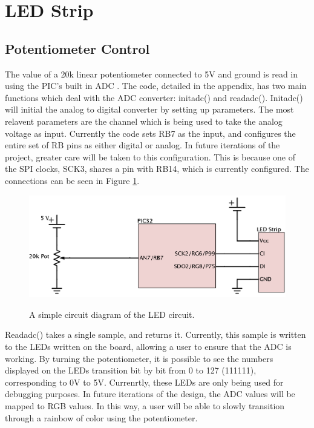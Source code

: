 \documentclass[11pt]{article}
\begin{document}
 
 

\section{LED Strip}

\subsection{Potentiometer Control}
The value of a 20k linear potentiometer connected to 5V and ground is read in using the PIC's built in ADC \cite{Section17ADC}. The code, detailed in the appendix, has two main functions which deal with the ADC converter: initadc() and readadc(). Initadc() will initial the analog to digital converter by setting up parameters. The most relavent parameters are the channel which is being used to take the analog voltage as input. Currently the code sets RB7 as the input, and configures the entire set of RB pins as either digital or analog. In future iterations of the project, greater care will be taken to this configuration. This is because one of the SPI clocks, SCK3, shares a pin with RB14, which is currently configured. The connections can be seen in Figure \ref{fig:adc}.


\begin{figure}[h!]
\centering
\includegraphics[width=.75\textwidth]{ledsys.png}
\caption{\label{fig:adc}} A simple circuit diagram of the LED circuit. 
\end{figure}

Readadc() takes a single sample, and returns it. Currently, this sample is written to the LEDs written on the board, allowing a user to ensure that the ADC is working. By turning the potentiometer, it is possible to see the numbers displayed on the LEDs transition bit by bit from 0 to 127 (111111), corresponding to 0V to 5V. Currenrtly, these LEDs are only being used for debugging purposes. In future iterations of the design, the ADC values will be mapped to RGB values. In this way, a user will be able to slowly transition through a rainbow of color using the potentiometer.
\end{document}
